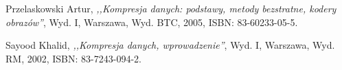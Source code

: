 
\begin{thebibliography}{99}

 Przelaskowski Artur, \emph{,,Kompresja danych: podstawy, metody bezstratne, kodery obraz\'{o}w''}, 
Wyd. I, Warszawa, Wyd. BTC, 2005, ISBN: 83-60233-05-5.

 Sayood Khalid, \emph{,,Kompresja danych, wprowadzenie''}, Wyd. I, Warszawa, Wyd. RM, 2002, ISBN: 83-7243-094-2.


\end{thebibliography}

\clearpage

